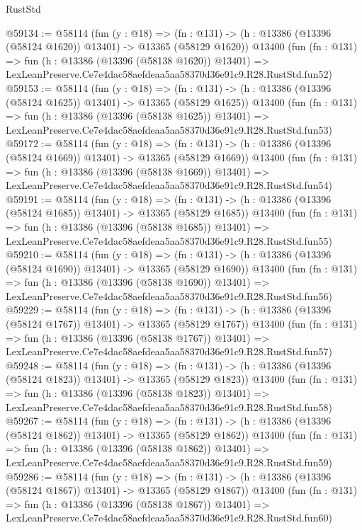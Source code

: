 \begin{lexlean}{RustStd}
\begin{coremodule}
@59134 := @58114
    (fun (y : @18) =>
    (fn : @131) -> (h : @13386 (@13396 (@58124 @1620)) @13401) -> @13365 (@58129 @1620))
    @13400
    (fun (fn : @131) =>
    fun (h : @13386 (@13396 (@58138 @1620)) @13401) =>
    LexLeanPreserve.Ce7e4dac58aefdeaa5aa58370d36e91c9.R28.RustStd.fun52)
@59153 := @58114
    (fun (y : @18) =>
    (fn : @131) -> (h : @13386 (@13396 (@58124 @1625)) @13401) -> @13365 (@58129 @1625))
    @13400
    (fun (fn : @131) =>
    fun (h : @13386 (@13396 (@58138 @1625)) @13401) =>
    LexLeanPreserve.Ce7e4dac58aefdeaa5aa58370d36e91c9.R28.RustStd.fun53)
@59172 := @58114
    (fun (y : @18) =>
    (fn : @131) -> (h : @13386 (@13396 (@58124 @1669)) @13401) -> @13365 (@58129 @1669))
    @13400
    (fun (fn : @131) =>
    fun (h : @13386 (@13396 (@58138 @1669)) @13401) =>
    LexLeanPreserve.Ce7e4dac58aefdeaa5aa58370d36e91c9.R28.RustStd.fun54)
@59191 := @58114
    (fun (y : @18) =>
    (fn : @131) -> (h : @13386 (@13396 (@58124 @1685)) @13401) -> @13365 (@58129 @1685))
    @13400
    (fun (fn : @131) =>
    fun (h : @13386 (@13396 (@58138 @1685)) @13401) =>
    LexLeanPreserve.Ce7e4dac58aefdeaa5aa58370d36e91c9.R28.RustStd.fun55)
@59210 := @58114
    (fun (y : @18) =>
    (fn : @131) -> (h : @13386 (@13396 (@58124 @1690)) @13401) -> @13365 (@58129 @1690))
    @13400
    (fun (fn : @131) =>
    fun (h : @13386 (@13396 (@58138 @1690)) @13401) =>
    LexLeanPreserve.Ce7e4dac58aefdeaa5aa58370d36e91c9.R28.RustStd.fun56)
@59229 := @58114
    (fun (y : @18) =>
    (fn : @131) -> (h : @13386 (@13396 (@58124 @1767)) @13401) -> @13365 (@58129 @1767))
    @13400
    (fun (fn : @131) =>
    fun (h : @13386 (@13396 (@58138 @1767)) @13401) =>
    LexLeanPreserve.Ce7e4dac58aefdeaa5aa58370d36e91c9.R28.RustStd.fun57)
@59248 := @58114
    (fun (y : @18) =>
    (fn : @131) -> (h : @13386 (@13396 (@58124 @1823)) @13401) -> @13365 (@58129 @1823))
    @13400
    (fun (fn : @131) =>
    fun (h : @13386 (@13396 (@58138 @1823)) @13401) =>
    LexLeanPreserve.Ce7e4dac58aefdeaa5aa58370d36e91c9.R28.RustStd.fun58)
@59267 := @58114
    (fun (y : @18) =>
    (fn : @131) -> (h : @13386 (@13396 (@58124 @1862)) @13401) -> @13365 (@58129 @1862))
    @13400
    (fun (fn : @131) =>
    fun (h : @13386 (@13396 (@58138 @1862)) @13401) =>
    LexLeanPreserve.Ce7e4dac58aefdeaa5aa58370d36e91c9.R28.RustStd.fun59)
@59286 := @58114
    (fun (y : @18) =>
    (fn : @131) -> (h : @13386 (@13396 (@58124 @1867)) @13401) -> @13365 (@58129 @1867))
    @13400
    (fun (fn : @131) =>
    fun (h : @13386 (@13396 (@58138 @1867)) @13401) =>
    LexLeanPreserve.Ce7e4dac58aefdeaa5aa58370d36e91c9.R28.RustStd.fun60)

\end{coremodule}
\end{lexlean}
